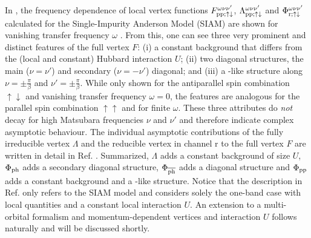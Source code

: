 \documentclass[../../main.tex]{subfiles}
\begin{document}
In , the frequency dependence of local vertex functions $F^{\omega\nu\nu'}_{\text{pp};\uparrow\downarrow}$, $\Lambda^{\omega\nu\nu'}_{\text{pp};\uparrow\downarrow}$ and $\Phi^{\omega\nu\nu'}_{\text{r};\uparrow\downarrow}$ calculated for the Single-Impurity Anderson Model (SIAM) are shown for vanishing transfer frequency $\omega$ \cite{high-freq asympt}. From this, one can see three very prominent and distinct features of the full vertex $F$: (i) a constant background that differs from the (local and constant) Hubbard interaction $U$; (ii) two diagonal structures, the main ($\nu=\nu'$) and secondary ($\nu=-\nu'$) diagonal; and (iii) a -like structure along $\nu=\pm\frac\pi\beta$ and $\nu'=\pm\frac\pi\beta$. While only shown for the antiparallel spin combination $\uparrow\downarrow$ and vanishing transfer frequency $\omega=0$, the features are analogous for the parallel spin combination $\uparrow\uparrow$ and for finite $\omega$. These three attributes do \textit{not} decay for high Matsubara frequencies $\nu$ and $\nu'$ and therefore indicate complex asymptotic behaviour. The individual asymptotic contributions of the fully irreducible vertex $\Lambda$ and the reducible vertex in channel r to the full vertex $F$ are written in detail in Ref. \cite{high-freq asympt}. Summarized, $\Lambda$ adds a constant background of size $U$, $\Phi_{\text{ph}}$ adds a secondary diagonal structure, $\Phi_{\overline{\text{ph}}}$ adds a diagonal structure and $\Phi_{\text{pp}}$ adds a constant background and a -like structure. Notice that the description in Ref. \cite{high-freq asympt} only refers to the SIAM model and considers solely the one-band case with local quantities and a constant local interaction $U$. An extension to a multi-orbital formalism and momentum-dependent vertices and interaction $U$ follows naturally and will be discussed shortly.
\end{document}
